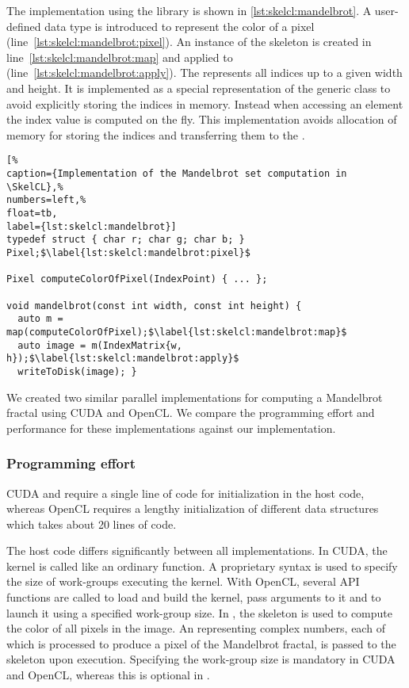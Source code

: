 The implementation using the \SkelCL library is shown in \autoref{lst:skelcl:mandelbrot}.
A user-defined data type is introduced to represent the color of a pixel (line~\ref{lst:skelcl:mandelbrot:pixel}).
An instance of the \map skeleton is created in line~\ref{lst:skelcl:mandelbrot:map} and applied to  (line~\ref{lst:skelcl:mandelbrot:apply}).
The  represents all indices up to a given width and height.
It is implemented as a special representation of the generic  class to avoid explicitly storing the indices in memory.
Instead when accessing an element the index value is computed on the fly.
This implementation avoids allocation of memory for storing the indices and transferring them to the \GPU.


\begin{lstlisting}[%                                                             
caption={Implementation of the Mandelbrot set computation in \SkelCL},%
numbers=left,%
float=tb,
label={lst:skelcl:mandelbrot}]
typedef struct { char r; char g; char b; } Pixel;$\label{lst:skelcl:mandelbrot:pixel}$

Pixel computeColorOfPixel(IndexPoint) { ... };

void mandelbrot(const int width, const int height) {
  auto m = map(computeColorOfPixel);$\label{lst:skelcl:mandelbrot:map}$
  auto image = m(IndexMatrix{w, h});$\label{lst:skelcl:mandelbrot:apply}$
  writeToDisk(image); }
\end{lstlisting}

We created two similar parallel implementations for computing a Mandelbrot fractal using CUDA and OpenCL.
We compare the programming effort and performance for these implementations against our \SkelCL implementation.

\subsubsection*{Programming effort}
\label{sec:mandelbrot:programming}

CUDA and \SkelCL require a single line of code for initialization in the host code, whereas OpenCL requires a lengthy initialization of different data structures which takes about 20 lines of code.

The host code differs significantly between all implementations.
In CUDA, the kernel is called like an ordinary function.
A proprietary syntax is used to specify the size of work-groups executing the kernel.
With OpenCL, several API functions are called to load and build the kernel, pass arguments to it and to launch it using a specified work-group size.
In \SkelCL, the \map skeleton is used to compute the color of all pixels in the image.
An  representing complex numbers, each of which is processed to produce a pixel of the Mandelbrot fractal, is passed to the \map skeleton upon execution.
Specifying the work-group size is mandatory in CUDA and OpenCL, whereas this is optional in \SkelCL.

